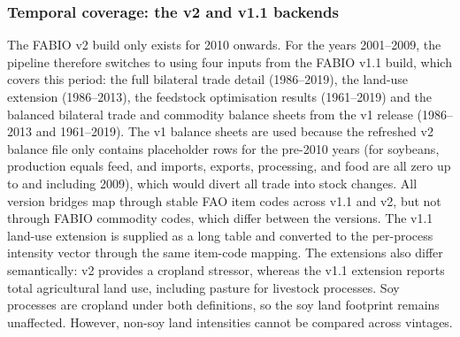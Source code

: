\subsubsection{Temporal coverage: the v2 and v1.1 backends}\label{subsubsec:backend}
The FABIO v2 build only exists for 2010 onwards. For the years 2001–2009, the pipeline therefore switches to using four inputs from the FABIO v1.1 build, which covers this period: the full bilateral trade detail (1986–2019), the land-use extension (1986–2013), the feedstock optimisation results (1961–2019) and the balanced bilateral trade and commodity balance sheets from the v1 release (1986–2013 and 1961–2019). The v1 balance sheets are used because the refreshed v2 balance file only contains placeholder rows for the pre-2010 years (for soybeans, production equals feed, and imports, exports, processing, and food are all zero up to and including 2009), which would divert all trade into stock changes. All version bridges map through stable FAO item codes across v1.1 and v2, but not through FABIO commodity codes, which differ between the versions. The v1.1 land-use extension is supplied as a long table and converted to the per-process intensity vector through the same item-code mapping. The extensions also differ semantically: v2 provides a cropland stressor, whereas the v1.1 extension reports total agricultural land use, including pasture for livestock processes. Soy processes are cropland under both definitions, so the soy land footprint remains unaffected. However, non-soy land intensities cannot be compared across vintages.

